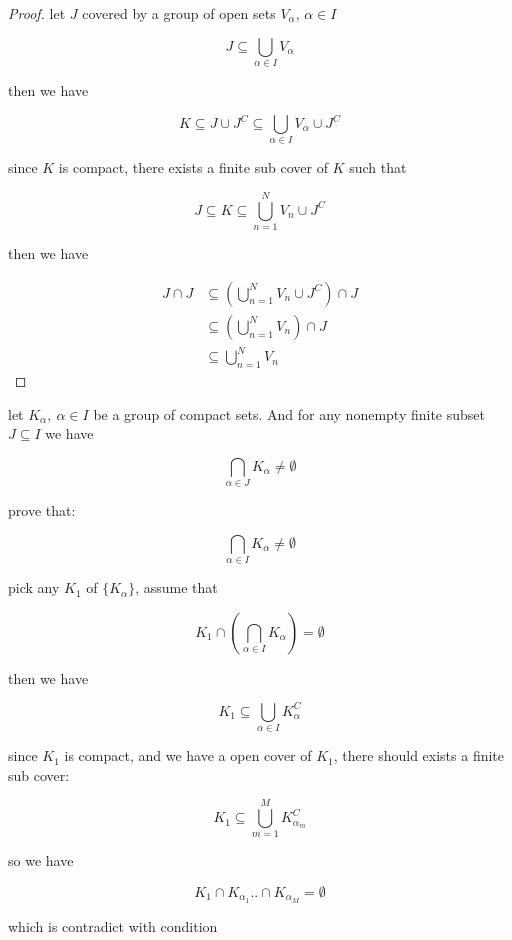 \documentclass[11pt,a4paper]{article}
\begin{document}
\begin{proof}
    let $J$ covered by a group of open sets $V_{\alpha},\, \alpha \in I$

    \[
        J \subseteq \bigcup_{\alpha \in I} V_{\alpha}
    \]

    then we have

    \[
        K \subseteq J \cup J^C \subseteq \bigcup_{\alpha \in I} V_{\alpha} \cup J^C
    \]

    since $K$ is compact, there exists a finite sub cover of $K$ such that

    \[
        J \subseteq K \subseteq \bigcup_{n=1}^{N} V_{n} \cup J^C
    \]

    then we have

    \begin{align*}
        J \cap J & \subseteq \left(\bigcup_{n=1}^{N} V_{n} \cup J^C \right) \cap J \\
        & \subseteq \left(\bigcup_{n=1}^{N} V_{n} \right) \cap J \\
        & \subseteq \bigcup_{n=1}^{N} V_{n} 
    \end{align*}
\end{proof}

\begin{exercise}
    let $K_{\alpha},\: \alpha \in I$ be a group of compact sets. And for any nonempty finite subset $J \subseteq I$ we have

    \[
        \bigcap_{\alpha \in J} K_{\alpha} \ne \emptyset
    \]

    prove that:

    \[
        \bigcap_{\alpha \in I} K_{\alpha} \ne \emptyset
    \]

    pick any $K_1$ of  $\{ K_{\alpha}\}$, assume that

    \[
        K_1 \cap \left( \bigcap_{\alpha \in I} K_{\alpha} \right) = \emptyset
    \]

    then we have

    \[
        K_1 \subseteq \bigcup_{\alpha \in I}K_{\alpha}^C
    \]

    since $K_1$ is compact, and we have a open cover of $K_1$, there should exists a finite sub cover:

    \[
        K_1 \subseteq \bigcup_{m=1}^{M}K_{\alpha_m}^C
    \]

    so we have

    \[
        K_1 \cap K_{\alpha_1} .. \cap K_{\alpha_M} = \emptyset
    \]

    which is contradict with condition
\end{exercise}
\end{document}
